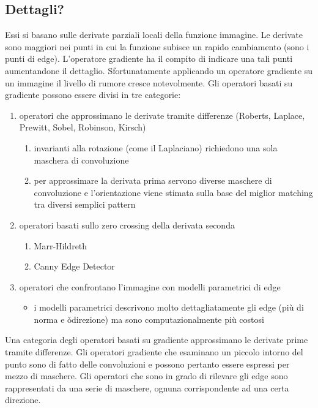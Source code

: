 \subsection{Dettagli?}
Essi si basano sulle derivate parziali locali della funzione immagine. Le derivate sono maggiori nei punti in cui la funzione subisce un rapido cambiamento (sono i punti di edge). L'operatore gradiente ha il compito di indicare una tali punti aumentandone il dettaglio. Sfortunatamente applicando un operatore gradiente su un immagine il livello di rumore cresce notevolmente.
Gli operatori basati su gradiente possono essere divisi in tre categorie:
\begin{enumerate}
	\item operatori	che approssimano le	derivate tramite differenze (Roberts, Laplace, Prewitt, Sobel, Robinson, Kirsch)
	\begin{enumerate}
		\item invarianti alla rotazione (come il Laplaciano) richiedono una sola maschera di convoluzione
		\item per approssimare la derivata prima servono diverse maschere di convoluzione e	l'orientazione viene stimata sulla base del miglior matching tra diversi semplici pattern
	\end{enumerate}
	
	\item operatori basati sullo zero crossing della derivata seconda
	\begin{enumerate}
		\item Marr-Hildreth
		\item Canny Edge Detector
	\end{enumerate}
	
	\item operatori che confrontano l'immagine con modelli parametrici di edge
	\begin{itemize}
		\item i modelli parametrici descrivono molto dettagliatamente gli edge (più di norma e \v{o}direzione) ma sono computazionalmente più costosi
	\end{itemize}
\end{enumerate}

Una categoria degli operatori basati su gradiente approssimano le derivate prime tramite differenze. Gli operatori gradiente che esaminano un piccolo intorno del punto sono di fatto delle convoluzioni e possono pertanto essere espressi per mezzo di maschere. Gli operatori che sono in grado di rilevare gli edge sono rappresentati da una serie di maschere, ognuna corrispondente ad una certa direzione.

